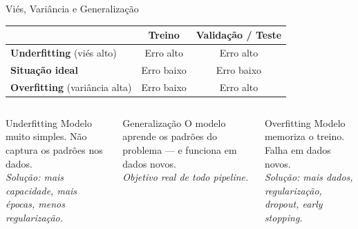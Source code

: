 \documentclass[aspectratio=169]{beamer}
\begin{document}
\begin{frame}{Viés, Variância e Generalização}
\begin{center}
\begin{tabular}{lcc}
  \toprule
  & \textbf{Treino} & \textbf{Validação / Teste} \\
  \midrule
  \textbf{Underfitting} (viés alto)   & Erro alto  & Erro alto \\
  \textbf{Situação ideal}              & Erro baixo & Erro baixo \\
  \textbf{Overfitting} (variância alta)& Erro baixo & Erro alto \\
  \bottomrule
\end{tabular}
\end{center}
\vfill
\begin{columns}
\begin{alertblock}{Underfitting}
  Modelo muito simples. Não captura os padrões nos dados.\\
  \textit{Solução: mais capacidade, mais épocas, menos regularização.}
\end{alertblock}
\begin{exampleblock}{Generalização}
  O modelo aprende os padrões do problema — e funciona em dados novos.\\
  \textit{Objetivo real de todo pipeline.}
\end{exampleblock}
\begin{alertblock}{Overfitting}
  Modelo memoriza o treino. Falha em dados novos.\\
  \textit{Solução: mais dados, regularização, dropout, early stopping.}
\end{alertblock}
\end{columns}
\end{frame}
\end{document}
